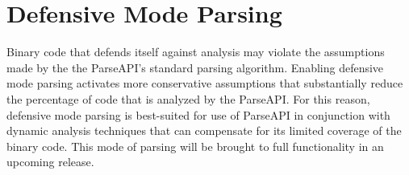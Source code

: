 \documentclass{article}
\begin{document}
\section{Defensive Mode Parsing}
\label{sec:defmode}

Binary code that defends itself against analysis may violate the
assumptions made by the the ParseAPI's standard parsing algorithm.
Enabling defensive mode parsing activates more conservative
assumptions that substantially reduce the percentage of code that is
analyzed by the ParseAPI.  For this reason, defensive mode parsing is
best-suited for use of ParseAPI in conjunction with dynamic analysis
techniques that can compensate for its limited coverage of the binary
code.  This mode of parsing will be brought to full functionality in 
an upcoming release.  
\end{document}
